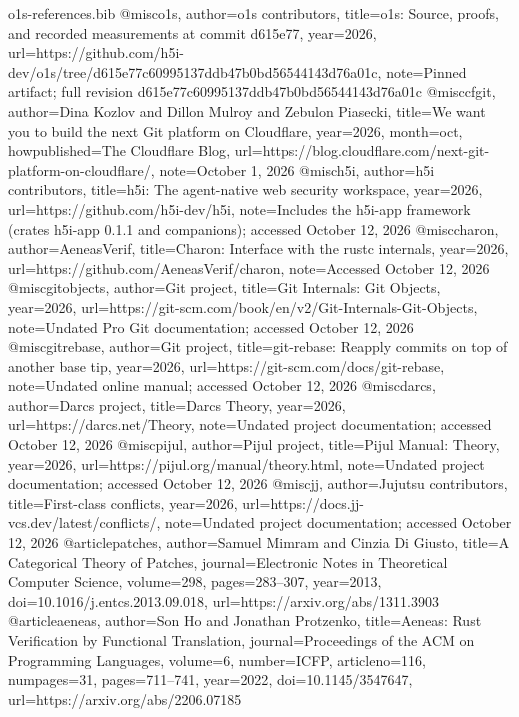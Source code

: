 \begin{filecontents*}[overwrite]{o1s-references.bib}
@misc{o1s, author={{o1s contributors}}, title={{o1s}: Source, proofs, and recorded measurements at commit d615e77}, year={2026}, url={https://github.com/h5i-dev/o1s/tree/d615e77c60995137ddb47b0bd56544143d76a01c}, note={Pinned artifact; full revision d615e77c60995137ddb47b0bd56544143d76a01c}}
@misc{cfgit, author={Dina Kozlov and Dillon Mulroy and Zebulon Piasecki}, title={We want you to build the next Git platform on Cloudflare}, year={2026}, month=oct, howpublished={The Cloudflare Blog}, url={https://blog.cloudflare.com/next-git-platform-on-cloudflare/}, note={October 1, 2026}}
@misc{h5i, author={{h5i contributors}}, title={h5i: The agent-native web security workspace}, year={2026}, url={https://github.com/h5i-dev/h5i}, note={Includes the h5i-app framework (crates h5i-app 0.1.1 and companions); accessed October 12, 2026}}
@misc{charon, author={{AeneasVerif}}, title={Charon: Interface with the rustc internals}, year={2026}, url={https://github.com/AeneasVerif/charon}, note={Accessed October 12, 2026}}
@misc{gitobjects, author={{Git project}}, title={Git Internals: Git Objects}, year={2026}, url={https://git-scm.com/book/en/v2/Git-Internals-Git-Objects}, note={Undated Pro Git documentation; accessed October 12, 2026}}
@misc{gitrebase, author={{Git project}}, title={git-rebase: Reapply commits on top of another base tip}, year={2026}, url={https://git-scm.com/docs/git-rebase}, note={Undated online manual; accessed October 12, 2026}}
@misc{darcs, author={{Darcs project}}, title={Darcs Theory}, year={2026}, url={https://darcs.net/Theory}, note={Undated project documentation; accessed October 12, 2026}}
@misc{pijul, author={{Pijul project}}, title={Pijul Manual: Theory}, year={2026}, url={https://pijul.org/manual/theory.html}, note={Undated project documentation; accessed October 12, 2026}}
@misc{jj, author={{Jujutsu contributors}}, title={First-class conflicts}, year={2026}, url={https://docs.jj-vcs.dev/latest/conflicts/}, note={Undated project documentation; accessed October 12, 2026}}
@article{patches, author={Samuel Mimram and Cinzia Di Giusto}, title={A Categorical Theory of Patches}, journal={Electronic Notes in Theoretical Computer Science}, volume={298}, pages={283--307}, year={2013}, doi={10.1016/j.entcs.2013.09.018}, url={https://arxiv.org/abs/1311.3903}}
@article{aeneas, author={Son Ho and Jonathan Protzenko}, title={Aeneas: Rust Verification by Functional Translation}, journal={Proceedings of the ACM on Programming Languages}, volume={6}, number={ICFP}, articleno={116}, numpages={31}, pages={711--741}, year={2022}, doi={10.1145/3547647}, url={https://arxiv.org/abs/2206.07185}}

\end{filecontents*}
